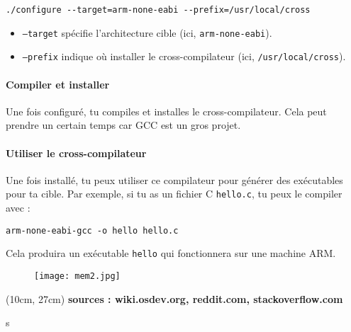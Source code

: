 \documentclass{article}
\begin{document}
\begin{lstlisting}
./configure --target=arm-none-eabi --prefix=/usr/local/cross
\end{lstlisting}

\begin{itemize}
    \item \texttt{--target} spécifie l'architecture cible (ici, \texttt{arm-none-eabi}).
    \item \texttt{--prefix} indique où installer le cross-compilateur (ici, \texttt{/usr/local/cross}).
\end{itemize}

\paragraph{Compiler et installer\\}
Une fois configuré, tu compiles et installes le cross-compilateur. Cela peut prendre un certain temps car GCC est un gros projet.

\paragraph{Utiliser le cross-compilateur\\}
Une fois installé, tu peux utiliser ce compilateur pour générer des exécutables pour ta cible. Par exemple, si tu as un fichier C \texttt{hello.c}, tu peux le compiler avec :

\begin{lstlisting}
arm-none-eabi-gcc -o hello hello.c
\end{lstlisting}

Cela produira un exécutable \texttt{hello} qui fonctionnera sur une machine ARM.\\
\begin{figure}[h!] %
    \centering %
    \texttt{[image: mem2.jpg]} %
    \label{fig:logo2} %
\end{figure}



\begin{textblock*}{10cm}(10cm, 27cm) %
    \textbf{sources : wiki.osdev.org, reddit.com, stackoverflow.com}
\end{textblock*}
s
\end{document}
